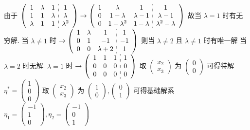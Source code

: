 	 \paragraph{} %
		 由于 $\left(\begin{array}{ccc:c}
					 1       & \lambda & 1       & 1         \\
					 1       & 1       & \lambda & \lambda   \\
					 \lambda & 1       & 1       & \lambda^2
				 \end{array}\right) \to \left(\begin{array}{ccc:c}
					 1 & \lambda     & 1         & 1                 \\
					 0 & 1-\lambda   & \lambda-1 & \lambda-1         \\
					 0 & 1-\lambda^2 & 1-\lambda & \lambda^2-\lambda
				 \end{array}\right)$
		 故当 $\lambda=1$ 时有无穷解.
		 当 $\lambda \neq 1$ 时 $\to \left(\begin{array}{ccc:c}
					 1 & \lambda & 1         & 1  \\
					 0 & 1       & -1        & -1 \\
					 0 & 0       & \lambda+2 & 1
				 \end{array}\right)$
		 则当 $\lambda \neq 2$ 且 $\lambda \neq 1$ 时有唯一解
		 当 $\lambda=2$ 时无解.
		 $\lambda=1$ 时 $\to \left(\begin{array}{ccc:c}
					 1 & 1 & 1 & 1 \\
					 0 & 0 & 0 & 0 \\
					 0 & 0 & 0 & 0
				 \end{array}\right)$
		 取 $\begin{pmatrix}
				 x_2 \\
				 x_3
			 \end{pmatrix}$ 为 $\begin{pmatrix}
				 0 \\
				 0
			 \end{pmatrix}$ 可得特解 $\eta^* = \begin{pmatrix}
				 1 \\
				 0 \\
				 0
			 \end{pmatrix}$
		 取 $\begin{pmatrix}
				 x_2 \\
				 x_3
			 \end{pmatrix}$ 为 $\begin{pmatrix}
				 1 \\
				 0
			 \end{pmatrix}, \begin{pmatrix}
				 0 \\
				 1
			 \end{pmatrix}$ 可得基础解系 $\eta_1 = \begin{pmatrix}
				 -1 \\
				 1  \\
				 0
			 \end{pmatrix}, \eta_2 = \begin{pmatrix}
				 -1 \\
				 0  \\
				 1
			 \end{pmatrix}$
